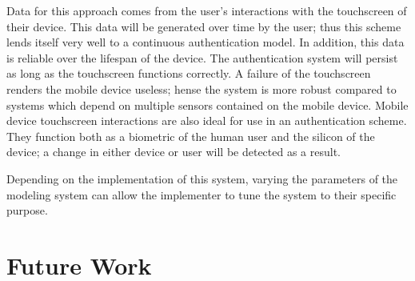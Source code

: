 \documentclass{acm_proc_article-sp}
\begin{document}
Data for this approach comes from the user's interactions with the touchscreen of their device. This data will be generated over time by the user; thus this scheme lends itself very well to a continuous authentication model. In addition, this data is reliable over the lifespan of the device. The authentication system will persist as long as the touchscreen functions correctly. A failure of the touchscreen renders the mobile device useless; hense the system is more robust compared to systems which depend on multiple sensors contained on the mobile device.
Mobile device touchscreen interactions are also ideal for use in an authentication scheme. They function both as a biometric of the human user and the silicon of the device; a change in either device or user will be detected as a result.

Depending on the implementation of this system, varying the parameters of the modeling system can allow the implementer to tune the system to their specific purpose. 

\section{Future Work}
\label{sec:futurework}



\end{document}
